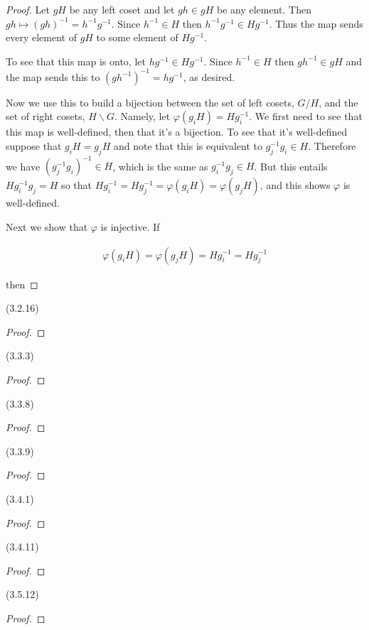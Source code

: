 \documentclass{exam}
\begin{document}
\begin{questions}
\begin{proof}
  Let $gH$ be any left coset and let $gh\in gH$ be any element.  Then $gh\mapsto (gh)^{-1} = h^{-1}g^{-1}$.  Since $h^{-1}\in H$ then $h^{-1}g^{-1}\in Hg^{-1}$.  Thus the map sends every element of $gH$ to some element of $Hg^{-1}$.

  To see that this map is onto, let $hg^{-1}\in Hg^{-1}$.  Since $h^{-1}\in H$ then $gh^{-1}\in gH$ and the map sends this to $(gh^{-1})^{-1}=hg^{-1}$, as desired.

  \vspace{1cm}

  Now we use this to build a bijection between the set of left cosets, $G/H$, and the set of right cosets, $H\backslash G$.  Namely, let $\varphi(g_iH)=Hg_i^{-1}$.  We first need to see that this map is well-defined, then that it's a bijection.  To see that it's well-defined suppose that $g_iH = g_jH$ and note that this is equivalent to $g_j^{-1}g_i\in H$.  Therefore we have $(g_j^{-1}g_i)^{-1}\in H$, which is the same as $g_i^{-1}g_j\in H$.  But this entails $Hg_i^{-1}g_j = H$ so that $Hg_i^{-1}=Hg_j^{-1}=\varphi(g_iH)=\varphi(g_jH)$, and this shows $\varphi$ is well-defined.

  Next we show that $\varphi$ is injective.  If

  \begin{align*}
    \varphi(g_iH) = \varphi(g_jH) = Hg_i^{-1} = Hg_j^{-1}
  \end{align*}

  then 
\end{proof}

\question(3.2.16)\\

\begin{proof}
\end{proof}

\question(3.3.3)\\

\begin{proof}
\end{proof}

\question(3.3.8)\\

\begin{proof}
\end{proof}

\question(3.3.9)\\

\begin{proof}
\end{proof}

\question(3.4.1)\\

\begin{proof}
\end{proof}

\question(3.4.11)\\

\begin{proof}
\end{proof}

\question(3.5.12)\\

\begin{proof}
\end{proof}


\end{questions}
\end{document}
